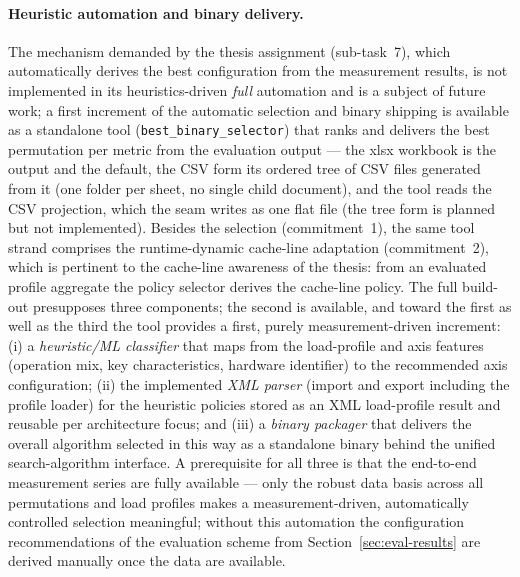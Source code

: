 \begin{nurlang}
\paragraph{Heuristic automation and binary delivery.} The mechanism demanded by the thesis
assignment (sub-task~7), which automatically derives the best configuration from the measurement
results, is not implemented in its heuristics-driven \emph{full} automation and is a subject of
future work; a first increment of the automatic selection and binary shipping is available as a
standalone tool (\texttt{best\_binary\_selector}) that ranks and delivers the best permutation per
metric from the evaluation output --- the xlsx workbook is the output and the default, the CSV form
its ordered tree of CSV files generated from it (one folder per sheet, no single child document),
and the tool reads the CSV projection, which the seam writes as one flat file (the tree form is
planned but not implemented). Besides the selection (commitment~1), the same tool strand
comprises the runtime-dynamic cache-line adaptation (commitment~2), which is pertinent to the
cache-line awareness of the thesis: from an evaluated profile aggregate the policy selector derives
the cache-line policy. The full build-out presupposes three components; the second is available,
and toward the first as well as the third the tool provides a first, purely measurement-driven
increment: (i) a \emph{heuristic/ML classifier} that maps from the load-profile and axis features
(operation mix, key characteristics, hardware identifier) to the recommended axis configuration;
(ii) the implemented \emph{XML parser} (import and export including the profile loader) for the
heuristic policies stored as an XML load-profile result and reusable per architecture focus; and
(iii) a \emph{binary packager} that delivers the overall algorithm selected in this way as a
standalone binary behind the unified search-algorithm interface. A prerequisite for all three is
that the end-to-end measurement series are fully available --- only the robust data basis across
all permutations and load profiles makes a measurement-driven, automatically controlled selection
meaningful; without this automation the configuration recommendations of the evaluation scheme
from Section~\ref{sec:eval-results} are derived manually once the data are available.


\end{nurlang}

